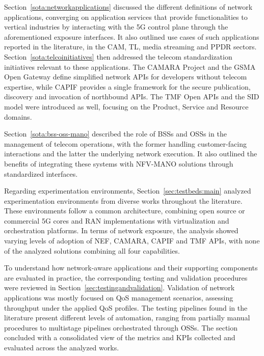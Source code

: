 Section~\ref{sota:networkapplications} discussed the different definitions of network applications, converging on application services that provide functionalities to vertical industries by interacting with the \acs{5G} control plane through the aforementioned exposure interfaces. It also outlined use cases of such applications reported in the literature, in the \acs{CAM}, \acs{TL}, media streaming and \acs{PPDR} sectors. Section~\ref{sota:telcoinitiatives} then addressed the telecom standardization initiatives relevant to these applications. The CAMARA Project and the \acs{GSMA} Open Gateway define simplified network \acsp{API} for developers without telecom expertise, while \acs{CAPIF} provides a single framework for the secure publication, discovery and invocation of northbound \acsp{API}. The \acs{TMF} Open \acsp{API} and the \acs{SID} model were introduced as well, focusing on the Product, Service and Resource domains.

Section~\ref{sota:bss-oss-mano} described the role of \acsp{BSS} and \acsp{OSS} in the management of telecom operations, with the former handling customer-facing interactions and the latter the underlying network execution. It also outlined the benefits of integrating these systems with \acs{NFV-MANO} solutions through standardized interfaces.

Regarding experimentation environments, Section~\ref{sec:testbeds:main} analyzed experimentation environments from diverse works throughout the literature. These environments follow a common architecture, combining open source or commercial \acs{5G} cores and \acs{RAN} implementations with virtualization and orchestration platforms. In terms of network exposure, the analysis showed varying levels of adoption of \acs{NEF}, CAMARA, \acs{CAPIF} and \acs{TMF} \acsp{API}, with none of the analyzed solutions combining all four capabilities.

To understand how network-aware applications and their supporting components are evaluated in practice, the corresponding testing and validation procedures were reviewed in Section~\ref{sec:testingandvalidation}. Validation of network applications was mostly focused on \acs{QoS} management scenarios, assessing throughput under the applied \acs{QoS} profiles. The testing pipelines found in the literature present different levels of automation, ranging from partially manual procedures to multistage pipelines orchestrated through \acsp{OSS}. The section concluded with a consolidated view of the metrics and \acsp{KPI} collected and evaluated across the analyzed works.
